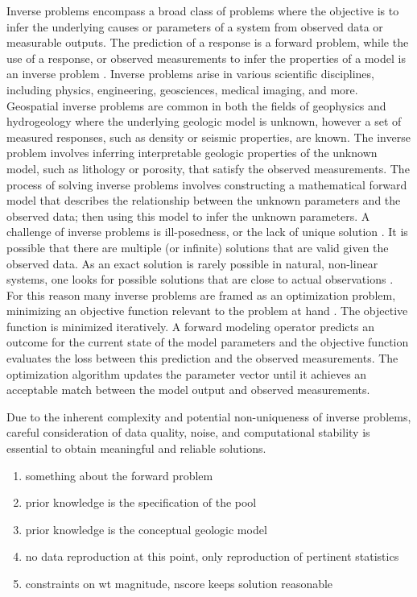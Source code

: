 Inverse problems encompass a broad class of problems where the objective is to infer the underlying causes or parameters of a system from observed data or measurable outputs. The prediction of a response is a forward problem, while the use of a response, or observed measurements to infer the properties of a model is an inverse problem \citep{tarantola2005inverse}. Inverse problems arise in various scientific disciplines, including physics, engineering, geosciences, medical imaging, and more. Geospatial inverse problems are common in both the fields of geophysics \citep{linde2015geological} and hydrogeology \citep{zhou2014inverse} where the underlying geologic model is unknown, however a set of measured responses, such as density or seismic properties, are known. The inverse problem involves inferring interpretable geologic properties of the unknown model, such as lithology or porosity, that satisfy the observed measurements. The process of solving inverse problems involves constructing a mathematical forward model that describes the relationship between the unknown parameters and the observed data; then using this model to infer the unknown parameters. A challenge of inverse problems is ill-posedness, or the lack of unique solution \citep{tarantola2005inverse}. It is possible that there are multiple (or infinite) solutions that are valid given the observed data. As an exact solution is rarely possible in natural, non-linear systems, one looks for possible solutions that are close to actual observations \citep{bardossy2016random}. For this reason many inverse problems are framed as an optimization problem, minimizing an objective function relevant to the problem at hand \citep{giraud2019integration,nava-flores2023high,athens2022stochastic}. The objective function is minimized iteratively. A forward modeling operator predicts an outcome for the current state of the model parameters and the objective function evaluates the loss between this prediction and the observed measurements. The optimization algorithm updates the parameter vector until it achieves an acceptable match between the model output and observed measurements.

Due to the inherent complexity and potential non-uniqueness of inverse problems, careful consideration of data quality, noise, and computational stability is essential to obtain meaningful and reliable solutions.

\begin{enumerate}
    \item something about the forward problem
    \item prior knowledge is the specification of the pool
    \item prior knowledge is the conceptual geologic model
    \item no data reproduction at this point, only reproduction of pertinent statistics
    \item constraints on wt magnitude, nscore keeps solution reasonable
\end{enumerate}


